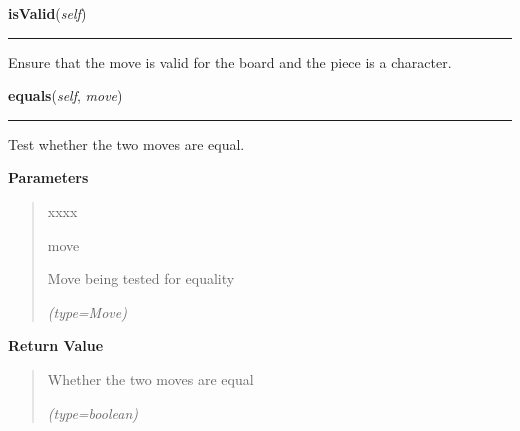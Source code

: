     \label{UnBlockMeSolver:Map:Move:Move:isValid}

    \vspace{0.5ex}

\hspace{.8\funcindent}\begin{boxedminipage}{\funcwidth}

    \raggedright \textbf{isValid}(\textit{self})

    \vspace{-1.5ex}

    \rule{\textwidth}{0.5\fboxrule}
\setlength{\parskip}{2ex}
    Ensure that the move is valid for the board and the piece is a 
    character.

\setlength{\parskip}{1ex}
    \end{boxedminipage}

    \label{UnBlockMeSolver:Map:Move:Move:equals}

    \vspace{0.5ex}

\hspace{.8\funcindent}\begin{boxedminipage}{\funcwidth}

    \raggedright \textbf{equals}(\textit{self}, \textit{move})

    \vspace{-1.5ex}

    \rule{\textwidth}{0.5\fboxrule}
\setlength{\parskip}{2ex}
    Test whether the two moves are equal.

\setlength{\parskip}{1ex}
      \textbf{Parameters}
      \vspace{-1ex}

      \begin{quote}
        \begin{Ventry}{xxxx}

          \item[move]

          Move being tested for equality

            {\it (type=Move)}

        \end{Ventry}

      \end{quote}

      \textbf{Return Value}
    \vspace{-1ex}

      \begin{quote}
      Whether the two moves are equal

      {\it (type=boolean)}

      \end{quote}

    \end{boxedminipage}


